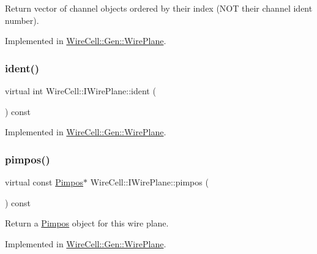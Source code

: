 Return vector of channel objects ordered by their index (N\+OT their channel ident number). 

Implemented in \hyperlink{class_wire_cell_1_1_gen_1_1_wire_plane_aa338b325c5266d901cd8d9656aa025c0}{Wire\+Cell\+::\+Gen\+::\+Wire\+Plane}.

\mbox{\label{class_wire_cell_1_1_i_wire_plane_af6ee6155a91ec58ba2abbec9bab63a39}} 
\subsubsection{\texorpdfstring{ident()}{ident()}}
{\footnotesize\ttfamily virtual int Wire\+Cell\+::\+I\+Wire\+Plane\+::ident (\begin{DoxyParamCaption}{ }\end{DoxyParamCaption}) const\hspace{0.3cm}{\ttfamily [pure virtual]}}



Implemented in \hyperlink{class_wire_cell_1_1_gen_1_1_wire_plane_ab043322069a1487486a32e0744897357}{Wire\+Cell\+::\+Gen\+::\+Wire\+Plane}.

\mbox{\label{class_wire_cell_1_1_i_wire_plane_a906ad17d425080349082a719b4362a36}} 
\subsubsection{\texorpdfstring{pimpos()}{pimpos()}}
{\footnotesize\ttfamily virtual const \hyperlink{class_wire_cell_1_1_pimpos}{Pimpos}$\ast$ Wire\+Cell\+::\+I\+Wire\+Plane\+::pimpos (\begin{DoxyParamCaption}{ }\end{DoxyParamCaption}) const\hspace{0.3cm}{\ttfamily [pure virtual]}}



Return a \hyperlink{class_wire_cell_1_1_pimpos}{Pimpos} object for this wire plane. 



Implemented in \hyperlink{class_wire_cell_1_1_gen_1_1_wire_plane_adb80d740c4f245ae7fa6b26ccd539685}{Wire\+Cell\+::\+Gen\+::\+Wire\+Plane}.

